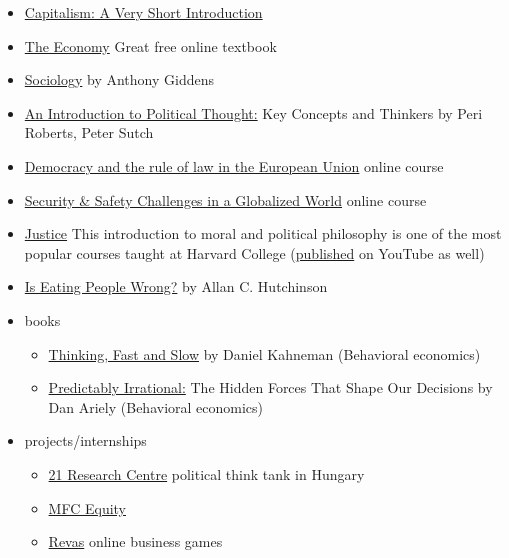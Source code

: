 \documentclass{article}
\begin{document}
\begin{itemize}
    \item \href{https://www.veryshortintroductions.com/view/10.1093/actrade/9780198726074.001.0001/actrade-9780198726074}{Capitalism: A Very Short Introduction}
    \item \href{https://www.core-econ.org/the-economy/book/text/0-3-contents.html}{The Economy} Great free online textbook
    \item \href{https://www.goodreads.com/book/show/46423.Sociology}{Sociology} by Anthony Giddens
    \item \href{https://www.goodreads.com/book/show/5246256-an-introduction-to-political-thought}{An Introduction to Political Thought:} Key Concepts and Thinkers by Peri Roberts, Peter Sutch
    \item \href{https://reconnect-europe.eu/mooc/}{Democracy and the rule of law in the European Union} online course
    \item \href{https://www.coursera.org/learn/security-safety-globalized-world}{Security \& Safety Challenges in a Globalized World} online course
    \item \href{https://www.edx.org/course/justice-2}{Justice} This introduction to moral and political philosophy is one of the most popular courses taught at Harvard College
    (\href{https://www.youtube.com/watch?v=kBdfcR-8hEY}{published} on YouTube as well)
    \item \href{https://www.goodreads.com/en/book/show/10428480-is-eating-people-wrong}{Is Eating People Wrong?}  by Allan C. Hutchinson
    \item books
    \begin{itemize}
        \item \href{https://www.goodreads.com/book/show/11468377-thinking-fast-and-slow}{Thinking, Fast and Slow} by Daniel Kahneman (Behavioral economics)

        \item \href{https://www.goodreads.com/book/show/1713426.Predictably_Irrational}{Predictably Irrational:} The Hidden Forces That Shape Our Decisions by Dan Ariely (Behavioral economics)
    \end{itemize}
    \item projects/internships
    \begin{itemize}
        \item \href{https://21kutatokozpont.hu/index.html}{21 Research Centre} political think tank in Hungary
        \item \href{https://mfcequity.com/}{MFC Equity}
        \item \href{https://www.revas.online/en/}{Revas} online business games
    \end{itemize}
\end{itemize}
\end{document}
